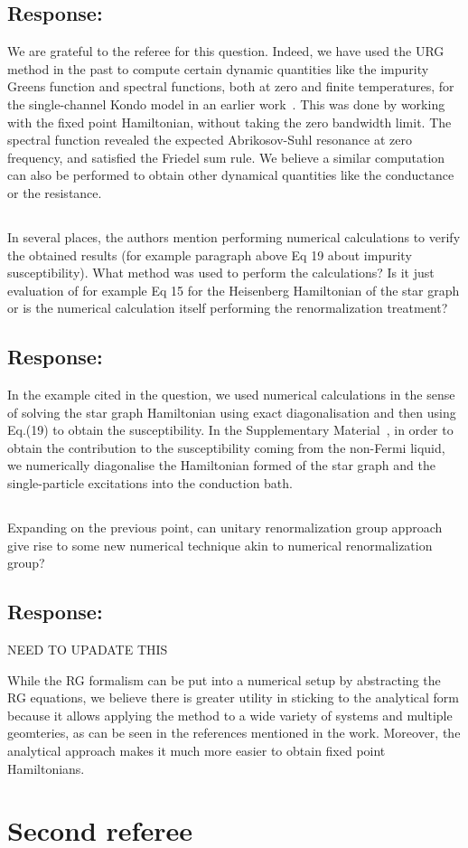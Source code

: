 \documentclass{article}
\newcommand{\response}[1]{{\color{blue}\subsection*{Response:}{#1}}}
\newcommand{\point}[1]{\subsection{}{#1}}
\begin{document}
\response{ We are grateful to the referee for this question. Indeed, we have used the URG method in the past to compute certain dynamic quantities like the impurity Greens function and spectral functions, both at zero and finite temperatures, for the single-channel Kondo model in an earlier work~\cite{kondo_urg}. This was done by working with the fixed point Hamiltonian, without taking the zero bandwidth limit. The spectral function revealed the expected Abrikosov-Suhl resonance at zero frequency, and satisfied the Friedel sum rule. We believe a similar  computation can also be performed to obtain other dynamical quantities like the conductance or the resistance.}

\point{
In several places, the authors mention performing numerical calculations to verify the obtained results (for example paragraph above Eq 19 about impurity susceptibility). What method was used to perform the calculations? Is it just evaluation of for example Eq 15 for the Heisenberg Hamiltonian of the star graph or is the numerical calculation itself performing the renormalization treatment?}

\response{ In the example cited in the question, we used numerical calculations in the sense of solving the star graph Hamiltonian using exact diagonalisation and then using Eq.(19) to obtain the susceptibility. In the Supplementary Material~\cite{SM}, in order to obtain the contribution to the susceptibility coming from the non-Fermi liquid, we numerically diagonalise the Hamiltonian formed of the star graph and the single-particle excitations into the conduction bath.}

\point{
Expanding on the previous point, can unitary renormalization group approach give rise to some new numerical technique akin to numerical renormalization group?}

\response{
NEED TO UPADATE THIS 

While the RG formalism can be put into a numerical setup by abstracting the RG equations, we believe there is greater utility in sticking to the analytical form because it allows applying the method to a wide variety of systems and multiple geomteries, as can be seen in the references mentioned in the work. Moreover, the analytical approach makes it much more easier to obtain fixed point Hamiltonians.}

\section{Second referee}
\end{document}
